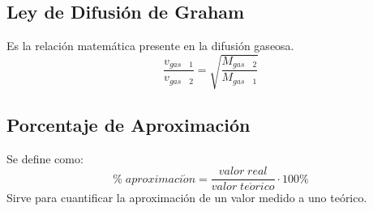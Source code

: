 \documentclass[../main.tex]{subfiles}
\begin{document}
\subsection{Ley de Difusión de Graham}
Es la relación matemática presente en la difusión gaseosa.
\begin{equation} \label{diffusion_eq} 
    \frac{v_{gas\quad 1}}{v_{gas\quad 2}} =
    \sqrt{\frac{M_{gas\quad 2}}{M_{gas\quad 1}}} 
\end{equation}

\subsection{Porcentaje de Aproximación}
Se define como:
\[ \% \; aproximaci\acute{o}n = \frac{valor\; real}{valor\; te\acute{o}rico} \cdot 100\%\]
Sirve para cuantificar la aproximación de un valor medido a uno teórico.
\end{document}
